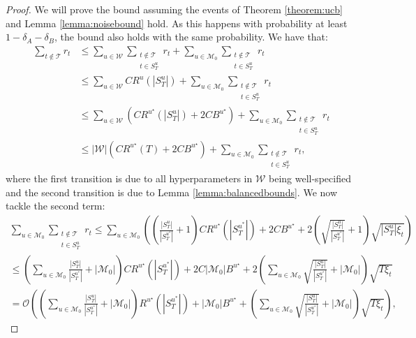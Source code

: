 \documentclass{article}
\theoremstyle{plain}
\theoremstyle{definition}
\theoremstyle{remark}
\theoremstyle{plain}
\begin{document}
\begin{proof}


We will prove the bound assuming the events of Theorem \ref{theorem:ucb} and Lemma \ref{lemma:noisebound} hold. As this happens with probability at least $1 - \delta_A - \delta_B$, the bound also holds with the same probability. We have that:
\begin{align}
    \sum_{t \notin \mathcal{T}} r_t &\le \sum_{u \in \mathcal{W}} \sum_{\substack{ t \notin \mathcal{T} \\ t \in S_T^u }} r_t + \sum_{u \in \mathcal{M}_0} \sum_{\substack{t \notin \mathcal{T} \\ t \in S_T^u }} r_t \nonumber \\ 
    &\le \sum_{u \in \mathcal{W}}  CR^u(|S_T^u|) + \sum_{u \in\mathcal{M}_0} \sum_{\substack{t \notin \mathcal{T} \\ t \in S_T^u }} r_t  \nonumber \\
    &\le \sum_{u \in \mathcal{W}} \left( CR^{u^\star}(|S_T^u|) + 2CB^{u^\star} \right) + \sum_{u \in\mathcal{M}_0} \sum_{\substack{t \notin \mathcal{T} \\ t \in S_T^u }} r_t  \nonumber \\
    &\le |\mathcal{W}|\left( CR^{u^\star}(T) + 2CB^{u^\star} \right) + \sum_{u \in\mathcal{M}_0} \sum_{\substack{t \notin \mathcal{T} \\ t \in S_T^u }} r_t, \label{eq:regretbalacningincompletebound}
\end{align}
where the first transition is due to all hyperparameters in $\mathcal{W}$ being well-specified and the second transition is due to Lemma \ref{lemma:balancedbounds}. We now tackle the second term:
\begin{align*}
    \sum_{u \in\mathcal{M}_0} \sum_{\substack{t \notin \mathcal{T} \\ t \in S_T^u }} r_t \le \sum_{u \in\mathcal{M}_0} \left(  \left(\frac{|S_T^{u}|}{|S_T^{u^*}|} + 1 \right) CR^{u^\star}(|S_T^{u^*}|) + 2CB^{u^\star} + 2\left(\sqrt{\frac{|S_T^{u}|}{|S_T^{u^*}|}} + 1\right)\sqrt{|S_T^{u}|\xi_t} \right) \\
    \le   \left(\sum_{u \in\mathcal{M}_0}\frac{|S_T^{u}|}{|S_T^{u^*}|} + |\mathcal{M}_0| \right) CR^{u^\star}(|S_T^{u^*}|) + 2C|\mathcal{M}_0|B^{u^\star} + 2\left(\sum_{u \in\mathcal{M}_0}\sqrt{\frac{|S_T^{u}|}{|S_T^{u^*}|}} + |\mathcal{M}_0|\right)\sqrt{T\xi_t} \\
    = \mathcal{O}\left(  \left(\sum_{u \in\mathcal{M}_0}\frac{|S_T^{u}|}{|S_T^{u^*}|} + |\mathcal{M}_0| \right) R^{u^\star}(|S_T^{u^*}|) + |\mathcal{M}_0|B^{u^\star} + \left(\sum_{u \in\mathcal{M}_0}\sqrt{\frac{|S_T^{u}|}{|S_T^{u^*}|}} + |\mathcal{M}_0|\right)\sqrt{T\xi_t} \right),

\end{align*}
\end{proof}
\end{document}
